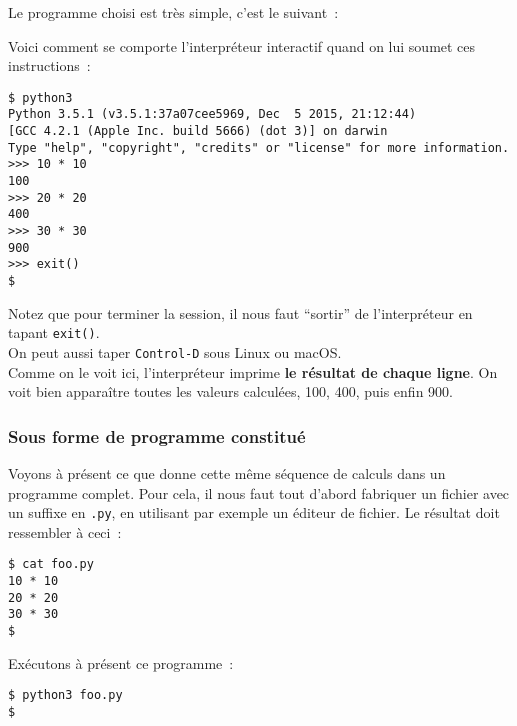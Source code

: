    Le programme choisi est très simple, c'est le suivant~:

    \begin{Shaded}
\begin{Highlighting}[]
 \OperatorTok{*} 
 \OperatorTok{*} 
 \OperatorTok{*} 
\end{Highlighting}
\end{Shaded}

    Voici comment se comporte l'interpréteur interactif quand on lui soumet
ces instructions~:

    \begin{verbatim}
$ python3
Python 3.5.1 (v3.5.1:37a07cee5969, Dec  5 2015, 21:12:44)
[GCC 4.2.1 (Apple Inc. build 5666) (dot 3)] on darwin
Type "help", "copyright", "credits" or "license" for more information.
>>> 10 * 10
100
>>> 20 * 20
400
>>> 30 * 30
900
>>> exit()
$
\end{verbatim}

    Notez que pour terminer la session, il nous faut ``sortir'' de
l'interpréteur en tapant \texttt{exit()}.\\

On peut aussi taper \texttt{Control-D} sous Linux ou macOS.\\

    Comme on le voit ici, l'interpréteur imprime \textbf{le résultat de
chaque ligne}. On voit bien apparaître toutes les valeurs calculées,
100, 400, puis enfin 900.

    \hypertarget{sous-forme-de-programme-constituuxe9}{%
\subsubsection{Sous forme de programme
constitué}\label{sous-forme-de-programme-constituuxe9}}

    Voyons à présent ce que donne cette même séquence de calculs dans un
programme complet. Pour cela, il nous faut tout d'abord fabriquer un
fichier avec un suffixe en \texttt{.py}, en utilisant par exemple un
éditeur de fichier. Le résultat doit ressembler à ceci~:

    \begin{verbatim}
$ cat foo.py
10 * 10
20 * 20
30 * 30
$
\end{verbatim}

    Exécutons à présent ce programme~:

    \begin{verbatim}
$ python3 foo.py
$
\end{verbatim}

